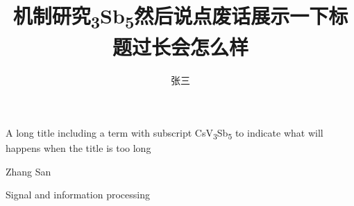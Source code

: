 
\title{
    机制研究\textsubscript{3}Sb\textsubscript{5}然后说点废话展示一下标题过长会怎么样
}{
    A long title including a term with subscript CsV\textsubscript{3}Sb\textsubscript{5} to indicate what will happens when the title is too long
}
\author{张三}{Zhang San}
\subject{安全利用}{Signal and information processing}
